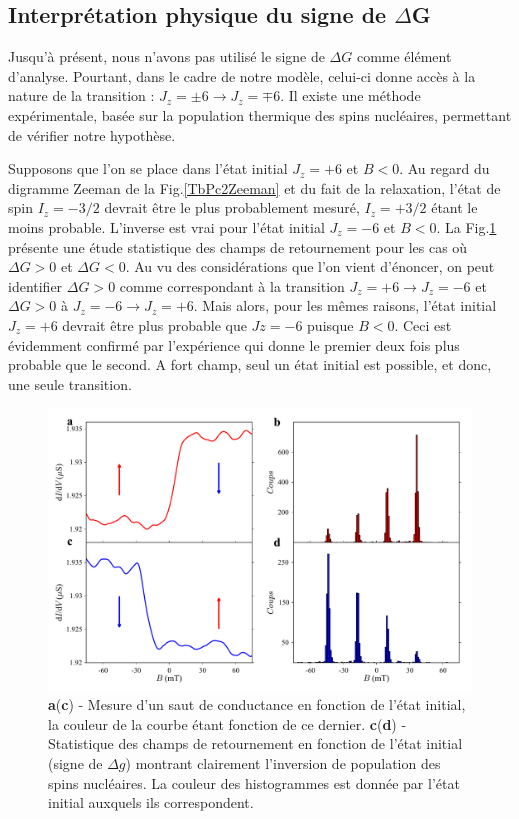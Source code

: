 \subsection{Interprétation physique du signe de $\Delta$G}
Jusqu'à présent, nous n'avons pas utilisé le signe de $\Delta G$ comme élément d'analyse. Pourtant, dans le cadre de notre modèle, celui-ci donne accès à la nature de la transition : $J_z = \pm6 \rightarrow J_z = \mp 6$. Il existe une méthode expérimentale, basée sur la population thermique des spins nucléaires, permettant de vérifier notre hypothèse.

Supposons que l'on se place dans l'état initial $J_z=+6$ et $B<0$. Au regard du digramme Zeeman de la Fig.\ref{TbPc2Zeeman} et du fait de la relaxation, l'état de spin $I_z = -3/2$ devrait être le plus probablement mesuré, $I_z = +3/2$ étant le moins probable. L'inverse est vrai pour l'état initial $J_z=-6$ et $B<0$. La Fig.\ref{analyse_signe_saut} présente une étude statistique des champs de retournement pour les cas où $\Delta G> 0$ et $\Delta G< 0$. Au vu des considérations que l'on vient d'énoncer, on peut identifier $\Delta G> 0$ comme correspondant à la transition $J_z = +6 \rightarrow J_z =  - 6$ et $\Delta G> 0$ à $J_z = -6 \rightarrow J_z =  + 6$. Mais alors, pour les mêmes raisons, l'état initial $J_z=+6$ devrait être plus probable que $Jz=-6$ puisque $B<0$. Ceci est évidemment confirmé par l'expérience qui donne le premier deux fois plus probable que le second. A fort champ, seul un état initial est possible, et donc, une seule transition. 

\begin{figure}
\includegraphics[scale=0.45]{Resultats/Chap1/Figure4/figure4.pdf} 
\caption{\textbf{a}(\textbf{c}) - Mesure d'un saut de conductance en fonction de l'état initial, la couleur de la courbe étant fonction de ce dernier. \textbf{c}(\textbf{d}) - Statistique des champs de retournement en fonction de l'état initial (signe de $\Delta g$) montrant clairement l'inversion de population des spins nucléaires. La couleur des histogrammes est donnée par l'état initial auxquels ils correspondent.}
\label{analyse_signe_saut}
\end{figure}

